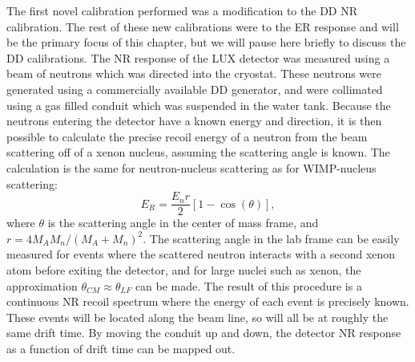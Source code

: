The first novel calibration performed was a modification to the DD NR calibration. The rest of these new calibrations were to the ER response and will be the primary focus of this chapter, but we will pause here briefly to discuss the DD calibrations. The NR response of the LUX detector was measured using a beam of neutrons which was directed into the cryostat. These neutrons were generated using a commercially available DD generator, and were collimated using a gas filled conduit which was suspended in the water tank. Because the neutrons entering the detector have a known energy and direction, it is then possible to calculate the precise recoil energy of a neutron from the beam scattering off of a xenon nucleus, assuming the scattering angle is known. The calculation is the same for neutron-nucleus scattering as for WIMP-nucleus scattering:
\begin{equation}
E_R=\frac{E_nr}{2}[1-\cos(\theta)],
\end{equation}
where $\theta$ is the scattering angle in the center of mass frame, and $r=4M_AM_n/(M_A+M_n)^2$. The scattering angle in the lab frame can be easily measured for events where the scattered neutron interacts with a second xenon atom before exiting the detector, and for large nuclei such as xenon, the approximation $\theta_{CM}\approx \theta_{LF}$ can be made. The result of this procedure is a continuous NR recoil spectrum where the energy of each event is precisely known. These events will be located along the beam line, so will all be at roughly the same drift time. By moving the conduit up and down, the detector NR response as a function of drift time can be mapped out.\cite{lux_dd1,lux_dd2}

